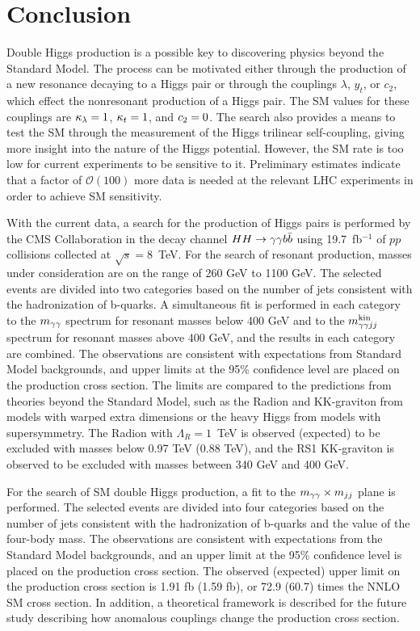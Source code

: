 
\chapter{Conclusion\label{ch:conclusion}}

Double Higgs production is a possible key to discovering physics beyond the Standard Model.
The process can be motivated either through the production of a new resonance decaying to
a Higgs pair or through the couplings $\lambda$, $y_t$, or $c_2$,
which effect the nonresonant production of a Higgs pair. The SM values for these couplings are
$\kappa_{\lambda} = 1$, $\kappa_{t} = 1$, and $c_2 = 0$. The search also provides a means
to test the SM through the measurement of the Higgs trilinear self-coupling, giving
more insight into the nature of the Higgs potential. However, the SM rate is too low
for current experiments to be sensitive to it. Preliminary estimates indicate that a factor of
$\mathcal{O}(100)$ more data is needed at the relevant LHC experiments in order to achieve
SM sensitivity.

With the current data, a search for the production of Higgs pairs is performed
by the CMS Collaboration in the decay channel $HH \rightarrow \gamma\gamma b\bar{b}$ using 19.7~fb$^{-1}$
of $pp$ collisions collected at $\sqrt{s} = 8$~TeV.
For the search of resonant production, masses under consideration are on the range of 260 GeV
to 1100 GeV. The selected events are divided into two categories based on the number of jets
consistent with the hadronization of b-quarks.
A simultaneous fit is performed in each category to the $m_{\gamma\gamma}$ spectrum for resonant masses
below 400 GeV and to the $m_{\gamma\gamma jj}^{\rm kin}$ spectrum for resonant masses above 400 GeV, and the results
in each category are combined. The observations are consistent with expectations from Standard
Model backgrounds, and upper limits at the 95\% confidence level are placed on the production
cross section. The limits are compared to the predictions from theories beyond the Standard Model,
such as the Radion and KK-graviton from models with warped extra dimensions or the heavy Higgs
from models with supersymmetry. The Radion with $\Lambda_R = 1$~TeV is observed (expected) to be
excluded with masses below 0.97 TeV (0.88 TeV), and the RS1 KK-graviton is observed to be
excluded with masses between 340 GeV and 400 GeV.

For the search of SM double Higgs production, a fit to the $m_{\gamma\gamma} \times m_{jj}$ plane 
is performed. The selected events are divided into four categories based on the number of jets
consistent with the hadronization of b-quarks and the value of the four-body mass.
The observations are consistent with expectations from the Standard Model backgrounds, and an
upper limit at the 95\% confidence level is placed on the production cross section.
The observed (expected) upper limit on the production cross section is 1.91 fb (1.59 fb),
or 72.9 (60.7) times the NNLO SM cross section. In addition, a theoretical framework is described
for the future study describing how anomalous couplings change the production cross section.
